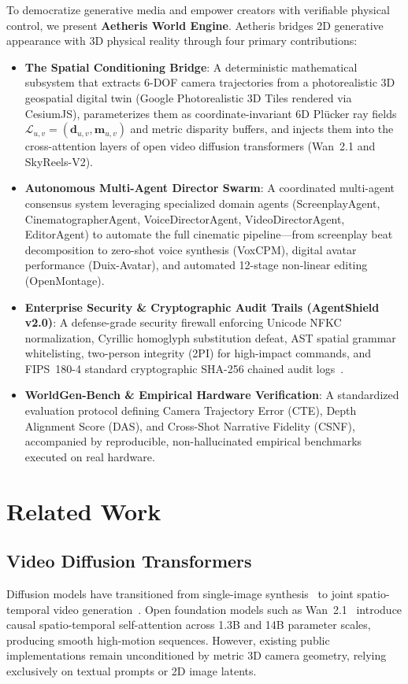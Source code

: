 \documentclass[10pt,twocolumn,letterpaper]{article}
\begin{document}
To democratize generative media and empower creators with verifiable physical control, we present \textbf{Aetheris World Engine}. Aetheris bridges 2D generative appearance with 3D physical reality through four primary contributions:
\begin{itemize}
    \item \textbf{The Spatial Conditioning Bridge}: A deterministic mathematical subsystem that extracts 6-DOF camera trajectories from a photorealistic 3D geospatial digital twin (Google Photorealistic 3D Tiles rendered via CesiumJS), parameterizes them as coordinate-invariant 6D Pl\"ucker ray fields $\mathcal{L}_{u,v} = (\mathbf{d}_{u,v}, \mathbf{m}_{u,v})$ and metric disparity buffers, and injects them into the cross-attention layers of open video diffusion transformers (Wan~2.1 and SkyReels-V2).
    \item \textbf{Autonomous Multi-Agent Director Swarm}: A coordinated multi-agent consensus system leveraging specialized domain agents (ScreenplayAgent, CinematographerAgent, VoiceDirectorAgent, VideoDirectorAgent, EditorAgent) to automate the full cinematic pipeline—from screenplay beat decomposition to zero-shot voice synthesis (VoxCPM), digital avatar performance (Duix-Avatar), and automated 12-stage non-linear editing (OpenMontage).
    \item \textbf{Enterprise Security \& Cryptographic Audit Trails (AgentShield v2.0)}: A defense-grade security firewall enforcing Unicode NFKC normalization, Cyrillic homoglyph substitution defeat, AST spatial grammar whitelisting, two-person integrity (2PI) for high-impact commands, and FIPS~180-4 standard cryptographic SHA-256 chained audit logs~\cite{nist2015sha}.
    \item \textbf{WorldGen-Bench \& Empirical Hardware Verification}: A standardized evaluation protocol defining Camera Trajectory Error (CTE), Depth Alignment Score (DAS), and Cross-Shot Narrative Fidelity (CSNF), accompanied by reproducible, non-hallucinated empirical benchmarks executed on real hardware.
\end{itemize}

\section{Related Work}

\subsection{Video Diffusion Transformers}
Diffusion models have transitioned from single-image synthesis~\cite{rombach2022high,zhang2023adding} to joint spatio-temporal video generation~\cite{ho2022video,blattmann2023stable}. Open foundation models such as Wan~2.1~\cite{wan2025open} introduce causal spatio-temporal self-attention across 1.3B and 14B parameter scales, producing smooth high-motion sequences. However, existing public implementations remain unconditioned by metric 3D camera geometry, relying exclusively on textual prompts or 2D image latents.
\end{document}
